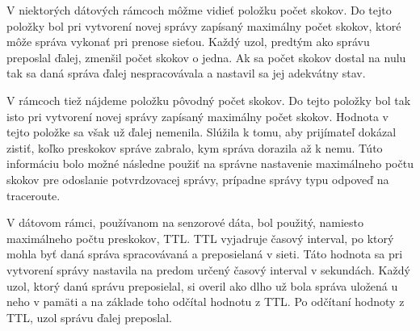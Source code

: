 \documentclass[slovak,master]{diploma}
\begin{document}
V niektorých dátových rámcoch môžme vidieť položku počet skokov. Do tejto položky bol pri vytvorení novej správy zapísaný maximálny počet skokov, ktoré môže správa vykonať 
pri prenose sieťou. Každý uzol, predtým ako správu preposlal ďalej, zmenšil počet skokov o jedna. Ak sa počet skokov dostal na nulu tak sa daná správa ďalej nespracovávala a nastavil sa jej 
adekvátny stav.

V rámcoch tiež nájdeme položku pôvodný počet skokov. Do tejto položky bol tak isto pri vytvorení novej správy zapísaný maximálny počet skokov. Hodnota v tejto položke sa 
však už ďalej nemenila. Slúžila k tomu, aby prijímateľ dokázal zistiť, koľko preskokov správe zabralo, kym správa dorazila až k nemu. Túto informáciu bolo možné 
následne použiť na správne nastavenie maximálneho počtu skokov pre odoslanie potvrdzovacej správy, prípadne správy typu odpoveď na traceroute.

\begin{table}[h!]
  \centering
  \qquad
  \caption{Štruktúra dátového rámcu pre ACK a senzorové správy.}
  \label{tab:frames}
\end{table}

V dátovom rámci, používanom na senzorové dáta, bol použitý, namiesto maximálneho počtu preskokov, TTL. TTL vyjadruje časový interval, po ktorý mohla byť daná správa 
spracovávaná a preposielaná v sieti. Táto hodnota sa pri vytvorení správy nastavila na predom určený časový interval v sekundách. Každý uzol, ktorý danú správu preposielal, 
si overil ako dlho už bola správa uložená u neho v pamäti a na základe toho odčítal hodnotu z TTL. Po odčítaní hodnoty z TTL, uzol správu ďalej preposlal.
\end{document}
